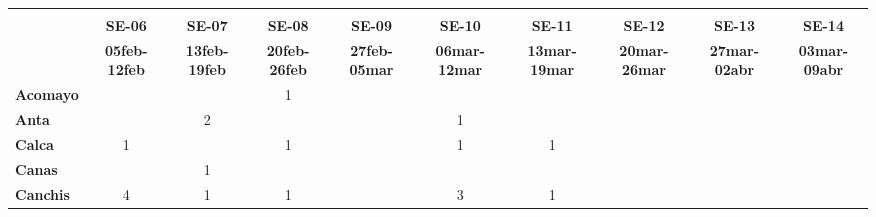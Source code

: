 \begin{tabular}{lccccccccc}
	\textbf{}              	  & \multicolumn{1}{l}{}                        & \multicolumn{1}{l}{}      & \multicolumn{1}{l}{}                         & \multicolumn{1}{l}{}                         & \multicolumn{1}{l}{}                         & \multicolumn{1}{l}{}                        & \multicolumn{1}{l}{}                         & \multicolumn{1}{l}{}                         & \multicolumn{1}{l}{}     \\
	\textbf{}                                                                          
	&\textbf{SE-06}								&\textbf{SE-07}				&\textbf{SE-08}
	&\textbf{SE-09}								&\textbf{SE-10}
	&\textbf{SE-11}								&\textbf{SE-12}
	&\textbf{SE-13} 							&\textbf{SE-14}\\
	\textbf{}              	  	
	&\textbf{05feb-12feb}						&\textbf{13feb-19feb}
	&\textbf{20feb-26feb}						&\textbf{27feb-05mar}
	&\textbf{06mar-12mar}						&\textbf{13mar-19mar}
	&\textbf{20mar-26mar}						&\textbf{27mar-02abr}
	&\textbf{03mar-09abr}\\
	\textbf{Acomayo}                        		
	&\cellcolor[HTML]{FCC46C}
	&\cellcolor[HTML]{FCC46C}					&1
	&\cellcolor[HTML]{FCC46C}					&\cellcolor[HTML]{FCC46C} 
	&\cellcolor[HTML]{FCC46C}					&\cellcolor[HTML]{FCC46C}
	&\cellcolor[HTML]{FCC46C}					&\cellcolor[HTML]{FCC46C}\\
	\textbf{Anta}                                                   			
	&\cellcolor[HTML]{FCC46C}					&2
	&\cellcolor[HTML]{FCC46C}					&\cellcolor[HTML]{FCC46C}					&1
	&\cellcolor[HTML]{FCC46C}					&\cellcolor[HTML]{FCC46C}
	&\cellcolor[HTML]{FCC46C}					&\cellcolor[HTML]{FCC46C}\\
	\textbf{Calca}      				       								            
	&1	
	&\cellcolor[HTML]{FCC46C}					&1											&\cellcolor[HTML]{FCC46C} 				&1											&1	
	&\cellcolor[HTML]{FCC46C}		   			&\cellcolor[HTML]{FCC46C}	&\cellcolor[HTML]{FCC46C}\\             			
	\textbf{Canas}                              		
	&\cellcolor[HTML]{FCC46C}
	&1											&\cellcolor[HTML]{FCC46C}
	&\cellcolor[HTML]{FCC46C}					&\cellcolor[HTML]{FCC46C}
	&\cellcolor[HTML]{FCC46C} 					&\cellcolor[HTML]{FCC46C}
	&\cellcolor[HTML]{FCC46C}					&\cellcolor[HTML]{FCC46C}\\
	\textbf{Canchis}                             		
	&4
	&1											&1
	&\cellcolor[HTML]{FCC46C}					&3
	&1											&\cellcolor[HTML]{FCC46C}
	&\cellcolor[HTML]{FCC46C}					&\cellcolor[HTML]{FCC46C}\\

\end{tabular}
